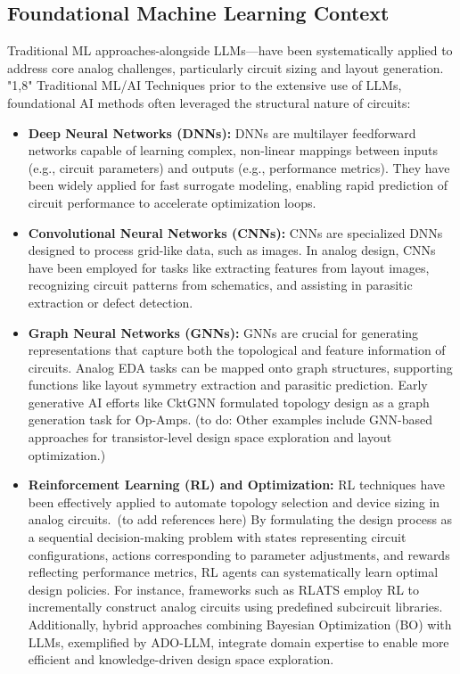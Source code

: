 \documentclass{ieeeaccess}
\begin{document}
\subsection{Foundational Machine Learning Context}
Traditional ML approaches-alongside LLMs—have been systematically applied to
address core analog challenges, particularly circuit sizing and layout
generation. "1,8" Traditional ML/AI Techniques prior to the extensive use of
LLMs, foundational AI methods often leveraged the structural nature of
circuits:

\begin{itemize}
	\item \textbf{Deep Neural Networks (DNNs):} DNNs are multilayer feedforward networks capable of learning complex, non-linear mappings between inputs (e.g., circuit parameters) and outputs (e.g., performance metrics). They have been widely applied for fast surrogate modeling, enabling rapid prediction of circuit performance to accelerate optimization loops.

	\item \textbf{Convolutional Neural Networks (CNNs):} CNNs are specialized DNNs designed to process grid-like data, such as images. In analog design, CNNs have been employed for tasks like extracting features from layout images, recognizing circuit patterns from schematics, and assisting in parasitic extraction or defect detection.

	\item \textbf{Graph Neural Networks (GNNs):} GNNs are crucial for generating representations that capture both the topological and feature information of circuits. Analog EDA tasks can be mapped onto graph structures, supporting functions like layout symmetry extraction and parasitic prediction. Early generative AI efforts like CktGNN formulated topology design as a graph generation task for Op-Amps. (to do: Other examples include GNN-based approaches for transistor-level design space exploration and layout optimization.)

	\item \textbf{Reinforcement Learning (RL) and Optimization:} RL techniques have been effectively applied to automate topology selection and device sizing in analog circuits.\ (to add references here) By formulating the design process as a sequential decision-making problem with states representing circuit configurations, actions corresponding to parameter adjustments, and rewards reflecting performance metrics, RL agents can systematically learn optimal design policies. \newline For instance, frameworks such as RLATS employ RL to incrementally construct analog circuits using predefined subcircuit libraries. Additionally, hybrid approaches combining Bayesian Optimization (BO) with LLMs, exemplified by ADO-LLM, integrate domain expertise to enable more efficient and knowledge-driven design space exploration.


\end{itemize}
\end{document}
